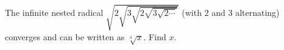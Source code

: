 The infinite nested radical $\sqrt{2\sqrt{3\sqrt{2\sqrt{3\sqrt{2\cdots}}}}}$ (with $2$ and $3$ alternating) converges and can be written as $\sqrt[3]{x}$. Find $x$.
